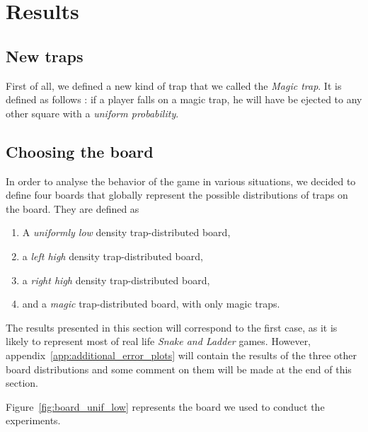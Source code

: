 \section{Results} %
\label{sec:results}

\subsection{New traps} %
\label{sub:new_traps}
First of all, we defined a new kind of trap that we called the \emph{Magic trap}. 
It is defined as follows : if a player falls on a magic trap, 
he will have be ejected to any other square with a \emph{uniform probability}. 


\subsection{Choosing the board} %
\label{sub:choosing_the_board}
In order to analyse the behavior of the game in various situations,
we decided to define four boards that globally represent the possible
distributions of traps on the board. They are defined as
\begin{enumerate}
  \item A \emph{uniformly low} density trap-distributed board,
  \item a \emph{left high} density trap-distributed board,
  \item a \emph{right high} density trap-distributed board,
  \item and a \emph{magic} trap-distributed board, with only magic traps.
\end{enumerate}
The results presented in this section will correspond to the first case,
as it is likely to represent most of real life \emph{Snake and Ladder} games.
However, appendix~\ref{app:additional_error_plots} will contain the results
of the three other board distributions and some comment on them will be
made at the end of this section.

Figure~\ref{fig:board_unif_low} represents the board we used to conduct the experiments.


